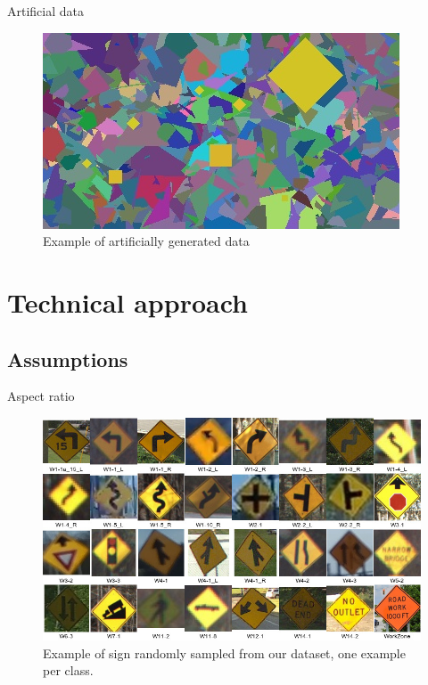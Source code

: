 \documentclass{beamer}
\begin{document}
\begin{frame}{Artificial data}
    \begin{figure}
        \centering
        \includegraphics[width=0.9\linewidth]{figures/fake_data_ex.jpg}
        \caption{Example of artificially generated data}
        \label{fig:fake_im_ex}
    \end{figure}{}
\end{frame}{}





\section{Technical approach}
\subsection{Assumptions}
\begin{frame}{Aspect ratio}
    \begin{figure}
        \centering
        \includegraphics[width=0.9\linewidth]{figures/classes_diamond_nocount.jpg}
        \caption{Example of sign randomly sampled from our dataset, one example per class.}
    \end{figure}{}
\end{frame}{}
\end{document}
